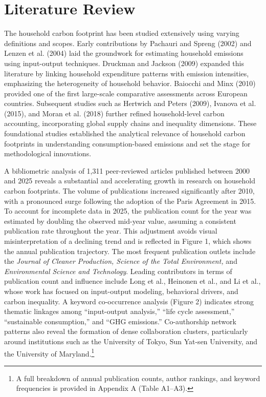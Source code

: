\documentclass[12pt,a4paper]{article}%
\begin{document}
\section{Literature Review}
The household carbon footprint has been studied extensively using varying definitions and scopes. Early contributions by Pachauri and Spreng (2002) and Lenzen et al. (2004) laid the groundwork for estimating household emissions using input-output techniques. Druckman and Jackson (2009) expanded this literature by linking household expenditure patterns with emission intensities, emphasizing the heterogeneity of household behavior. Baiocchi and Minx (2010) provided one of the first large-scale comparative assessments across European countries. Subsequent studies such as Hertwich and Peters (2009), Ivanova et al. (2015), and Moran et al. (2018) further refined household-level carbon accounting, incorporating global supply chains and inequality dimensions. These foundational studies established the analytical relevance of household carbon footprints in understanding consumption-based emissions and set the stage for methodological innovations.

A bibliometric analysis of 1,311 peer-reviewed articles published between 2000 and 2025 reveals a substantial and accelerating growth in research on household carbon footprints. The volume of publications increased significantly after 2010, with a pronounced surge following the adoption of the Paris Agreement in 2015. To account for incomplete data in 2025, the publication count for the year was estimated by doubling the observed mid-year value, assuming a consistent publication rate throughout the year. This adjustment avoids visual misinterpretation of a declining trend and is reflected in Figure 1, which shows the annual publication trajectory. The most frequent publication outlets include the \textit{Journal of Cleaner Production, Science of the Total Environment,} and \textit{Environmental Science and Technology}. Leading contributors in terms of publication count and influence include Long et al., Heinonen et al., and Li et al., whose work has focused on input-output modeling, behavioral drivers, and carbon inequality. A keyword co-occurrence analysis (Figure 2) indicates strong thematic linkages among “input-output analysis,” “life cycle assessment,” “sustainable consumption,” and “GHG emissions.” Co-authorship network patterns also reveal the formation of dense collaboration clusters, particularly around institutions such as the University of Tokyo, Sun Yat-sen University, and the University of Maryland.\footnote{A full breakdown of annual publication counts, author rankings, and keyword frequencies is provided in Appendix A (Table A1–A3).}
\end{document}
